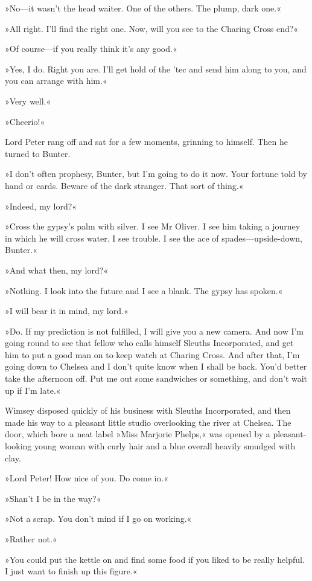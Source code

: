 »No—it wasn't the head waiter. One of the others. The plump, dark one.«

»All right. I'll find the right one. Now, will you see to the Charing Cross end?«

»Of course—if you really think it's any good.«

»Yes, I do. Right you are. I'll get hold of the 'tec and send him along to you, and you can arrange with him.«

»Very well.«

»Cheerio!«

Lord Peter rang off and sat for a few moments, grinning to himself. Then he turned to Bunter.

»I don't often prophesy, Bunter, but I'm going to do it now. Your fortune told by hand or cards. Beware of the dark stranger. That sort of thing.«

»Indeed, my lord?«

»Cross the gypsy's palm with silver. I see Mr Oliver. I see him taking a journey in which he will cross water. I see trouble. I see the ace of spades—upside-down, Bunter.«

»And what then, my lord?«

»Nothing. I look into the future and I see a blank. The gypsy has spoken.«

»I will bear it in mind, my lord.«

»Do. If my prediction is not fulfilled, I will give you a new camera. And now I'm going round to see that fellow who calls himself Sleuths Incorporated, and get him to put a good man on to keep watch at Charing Cross. And after that, I'm going down to Chelsea and I don't quite know when I shall be back. You'd better take the afternoon off. Put me out some sandwiches or something, and don't wait up if I'm late.«

Wimsey disposed quickly of his business with Sleuths Incorporated, and then made his way to a pleasant little studio overlooking the river at Chelsea. The door, which bore a neat label »Miss Marjorie Phelps,« was opened by a pleasant-looking young woman with curly hair and a blue overall heavily smudged with clay.

»Lord Peter! How nice of you. Do come in.«

»Shan't I be in the way?«

»Not a scrap. You don't mind if I go on working.«

»Rather not.«

»You could put the kettle on and find some food if you liked to be really helpful. I just want to finish up this figure.«

